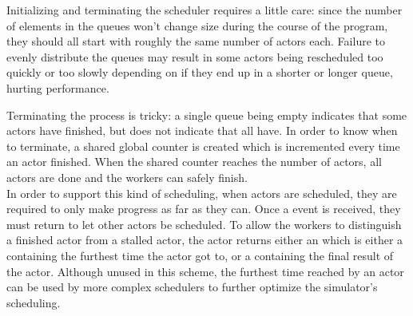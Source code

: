 Initializing and terminating the scheduler requires a little care: since the number of elements in the queues won't change size during the course of the program, they should all start with roughly the same number of actors each.
Failure to evenly distribute the queues may result in some actors being rescheduled too quickly or too slowly depending on if they end up in a shorter or longer queue, hurting performance.

Terminating the process is tricky: a single queue being empty indicates that some actors have finished, but does not indicate that all have.
In order to know when to terminate, a shared global counter is created which is incremented every time an actor finished.
When the shared counter reaches the number of actors, all actors are done and the workers can safely finish.
\\

In order to support this kind of scheduling, when actors are scheduled, they are required to only make progress as far as they can.
Once a  event is received, they must return to let other actors be scheduled.
To allow the workers to distinguish a finished actor from a stalled actor, the actor returns either an  which is either a  containing the furthest time the actor got to, or a  containing the final result of the actor.
Although unused in this scheme, the furthest time reached by an actor can be used by more complex schedulers to further optimize the simulator's scheduling.

